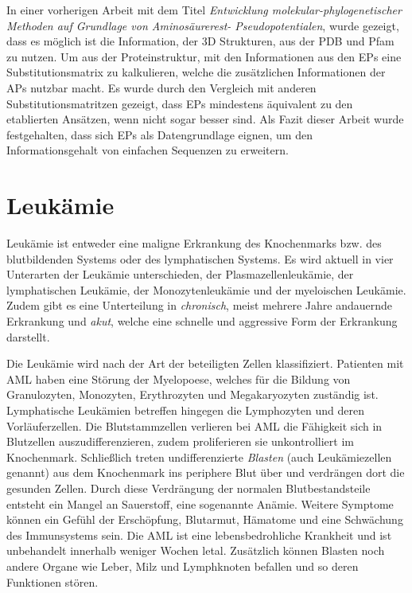 In einer vorherigen Arbeit mit dem Titel \emph{Entwicklung mole\-kular-phylo\-genetisch\-er Methoden auf Grundlage von Aminosäurerest- Pseudopotentialen}, wurde gezeigt, dass es möglich ist die Information, der 3D Strukturen, aus der \ac{PDB} und \ac{Pfam} zu nutzen\cite{Mathias.2014}. Um aus der Proteinstruktur, mit den Informationen aus den EPs eine Substitutionsmatrix zu kalkulieren, welche die zusätzlichen Informationen der \ac{APs} nutzbar macht. Es wurde durch den Vergleich mit anderen Substitutionsmatritzen gezeigt, dass \ac{EPs} mindestens äquivalent zu den etablierten Ansätzen, wenn nicht sogar besser sind. Als Fazit dieser Arbeit wurde festgehalten, dass sich \ac{EPs} als Datengrundlage eignen, um den Informationsgehalt von einfachen Sequenzen zu erweitern.


\section{Leukämie}
Leukämie ist entweder eine maligne Erkrankung des Knochenmarks bzw. des blutbildenden Systems oder des lymphatischen Systems. Es wird aktuell in vier Unterarten der Leukämie unterschieden, der Plasmazellenleukämie, der lymphatischen Leukämie, der Monozytenleukämie und der myeloischen Leukämie. Zudem gibt es eine Unterteilung in \emph{chronisch}, meist mehrere Jahre andauernde Erkrankung und \emph{akut}, welche eine schnelle und aggressive Form der Erkrankung darstellt.

Die Leukämie wird nach der Art der beteiligten Zellen klassifiziert. Patienten mit \ac{AML} haben eine Störung der Myelopoese, welches für die Bildung von Granulozyten, Monozyten, Erythrozyten und Megakaryozyten zuständig ist. Lymphatische Leukämien betreffen hingegen die Lymphozyten und deren Vorläuferzellen. Die Blutstammzellen verlieren bei \ac{AML} die Fähigkeit sich in Blutzellen auszudifferenzieren, zudem proliferieren sie unkontrolliert im Knochenmark\cite{Papaemmanuil.2016}. Schließlich treten undifferenzierte \emph{Blasten} (auch Leukämiezellen genannt) aus dem Knochenmark ins periphere Blut über und verdrängen dort die gesunden Zellen. Durch diese Verdrängung der normalen Blutbestandsteile entsteht ein Mangel an Sauerstoff, eine sogenannte Anämie. Weitere Symptome können ein Gefühl der Erschöpfung, Blutarmut, Hämatome und eine Schwächung des Immunsystems sein. Die \ac{AML} ist eine lebensbedrohliche Krankheit und ist unbehandelt innerhalb weniger Wochen letal. Zusätzlich können Blasten noch andere Organe wie Leber, Milz und Lymphknoten befallen und so deren Funktionen stören.

